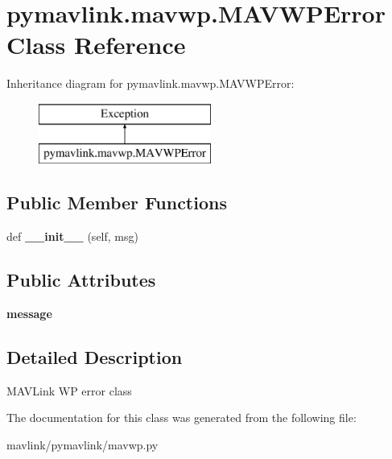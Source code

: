 \hypertarget{classpymavlink_1_1mavwp_1_1MAVWPError}{}\section{pymavlink.\+mavwp.\+M\+A\+V\+W\+P\+Error Class Reference}
\label{classpymavlink_1_1mavwp_1_1MAVWPError}
Inheritance diagram for pymavlink.\+mavwp.\+M\+A\+V\+W\+P\+Error\+:\begin{figure}[H]
\begin{center}
\leavevmode
\includegraphics[height=2.000000cm]{classpymavlink_1_1mavwp_1_1MAVWPError}
\end{center}
\end{figure}
\subsection*{Public Member Functions}
\begin{DoxyCompactItemize}
\item 
\mbox{\label{classpymavlink_1_1mavwp_1_1MAVWPError_a721056590680e02f6b73592650d6a3a3}} 
def {\bfseries \+\_\+\+\_\+init\+\_\+\+\_\+} (self, msg)
\end{DoxyCompactItemize}
\subsection*{Public Attributes}
\begin{DoxyCompactItemize}
\item 
\mbox{\label{classpymavlink_1_1mavwp_1_1MAVWPError_a8697ca92000e467cae067a8464d26625}} 
{\bfseries message}
\end{DoxyCompactItemize}


\subsection{Detailed Description}
\begin{DoxyVerb}MAVLink WP error class\end{DoxyVerb}
 

The documentation for this class was generated from the following file\+:\begin{DoxyCompactItemize}
\item 
mavlink/pymavlink/mavwp.\+py\end{DoxyCompactItemize}
